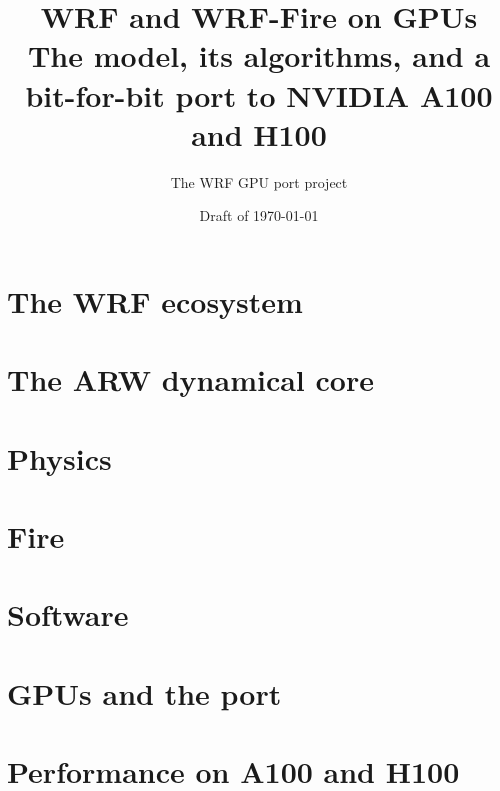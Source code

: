 \documentclass[11pt,openany]{book}
\title{WRF and WRF-Fire on GPUs\\[0.5em]
  \large The model, its algorithms, and a bit-for-bit port to NVIDIA A100 and H100}
\author{The WRF GPU port project}
\date{Draft of \today}
\begin{document}
\frontmatter
\maketitle
\tableofcontents


\mainmatter
\part{The WRF ecosystem}





\part{The ARW dynamical core}







\part{Physics}









\part{Fire}




\part{Software}




\part{GPUs and the port}






\part{Performance on A100 and H100}









\end{document}
